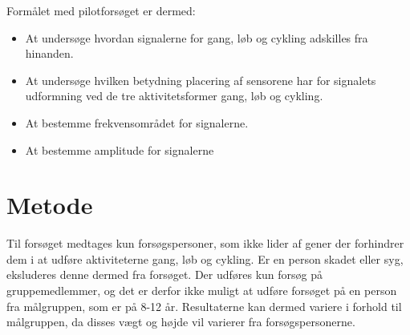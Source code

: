 Formålet med pilotforsøget er dermed:\vspace{-3mm}
\begin{itemize}
\item At undersøge hvordan signalerne for gang, løb og cykling adskilles fra hinanden. 
\item At undersøge hvilken betydning placering af sensorene har for signalets udformning ved de tre aktivitetsformer gang, løb og cykling. 
\item At bestemme frekvensområdet for signalerne.
\item At bestemme amplitude for signalerne 
\end{itemize}

\section{Metode}

Til forsøget medtages kun forsøgspersoner, som ikke lider af gener der forhindrer dem i at udføre aktiviteterne gang, løb og cykling. Er en person skadet eller syg, eksluderes denne dermed fra forsøget. Der udføres kun forsøg på gruppemedlemmer, og det er derfor ikke muligt at udføre forsøget på en person fra målgruppen, som er på 8-12 år. Resultaterne kan dermed variere i forhold til målgruppen, da disses vægt og højde vil varierer fra forsøgspersonerne. 

